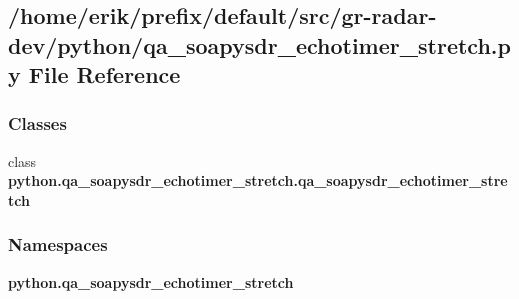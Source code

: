 \subsection{/home/erik/prefix/default/src/gr-\/radar-\/dev/python/qa\+\_\+soapysdr\+\_\+echotimer\+\_\+stretch.py File Reference}
\label{qa__soapysdr__echotimer__stretch_8py}
\subsubsection*{Classes}
\begin{DoxyCompactItemize}
\item 
class {\bf python.\+qa\+\_\+soapysdr\+\_\+echotimer\+\_\+stretch.\+qa\+\_\+soapysdr\+\_\+echotimer\+\_\+stretch}
\end{DoxyCompactItemize}
\subsubsection*{Namespaces}
\begin{DoxyCompactItemize}
\item 
 {\bf python.\+qa\+\_\+soapysdr\+\_\+echotimer\+\_\+stretch}
\end{DoxyCompactItemize}
